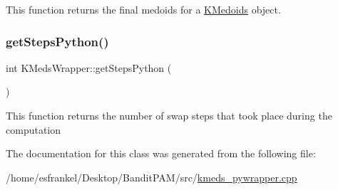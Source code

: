 This function returns the final medoids for a \hyperlink{classKMedoids}{K\+Medoids} object. \mbox{\label{classKMedsWrapper_a25ac2830354eeae7963cdec34d0137e8}} 
\subsubsection{\texorpdfstring{get\+Steps\+Python()}{getStepsPython()}}
{\footnotesize\ttfamily int K\+Meds\+Wrapper\+::get\+Steps\+Python (\begin{DoxyParamCaption}{ }\end{DoxyParamCaption})\hspace{0.3cm}{\ttfamily [inline]}}

This function returns the number of swap steps that took place during the computation 

The documentation for this class was generated from the following file\+:\begin{DoxyCompactItemize}
\item 
/home/esfrankel/\+Desktop/\+Bandit\+P\+A\+M/src/\hyperlink{kmeds__pywrapper_8cpp}{kmeds\+\_\+pywrapper.\+cpp}\end{DoxyCompactItemize}
